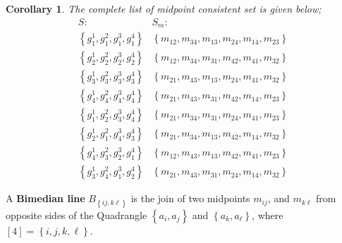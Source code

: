 \documentclass{unswthesis}
\newtheorem{corollary}[theorem]{Corollary}
\begin{document}
\begin{corollary}
The complete list of midpoint consistent set is given below;%
\begin{equation*}
\begin{array}{cc}
S: & S_{m}: \\ 
\left\{ g_{1}^{1},g_{1}^{2},g_{1}^{3},g_{1}^{4}\right\}  & \left\{
m_{12},m_{34},m_{13},m_{24},m_{14},m_{23}\right\}  \\ 
\left\{ g_{2}^{1},g_{2}^{2},g_{2}^{3},g_{2}^{4}\right\}  & \left\{
m_{12},m_{34},m_{31},m_{42},m_{41},m_{32}\right\}  \\ 
\left\{ g_{3}^{1},g_{3}^{2},g_{3}^{3},g_{3}^{4}\right\}  & \left\{
m_{21},m_{43},m_{13},m_{24},m_{41},m_{32}\right\}  \\ 
\left\{ g_{4}^{1},g_{4}^{2},g_{4}^{3},g_{4}^{4}\right\}  & \left\{
m_{21},m_{43},m_{31},m_{42},m_{14},m_{23}\right\}  \\ 
\left\{ g_{1}^{1},g_{2}^{2},g_{3}^{3},g_{4}^{4}\right\}  & \left\{
m_{21},m_{34},m_{31},m_{24},m_{41},m_{23}\right\}  \\ 
\left\{ g_{2}^{1},g_{1}^{2},g_{4}^{3},g_{3}^{4}\right\}  & \left\{
m_{21},m_{34},m_{13},m_{42},m_{14},m_{32}\right\}  \\ 
\left\{ g_{4}^{1},g_{3}^{2},g_{2}^{3},g_{1}^{4}\right\}  & \left\{
m_{12},m_{43},m_{13},m_{42},m_{41},m_{23}\right\}  \\ 
\left\{ g_{3}^{1},g_{4}^{2},g_{1}^{3},g_{2}^{4}\right\}  & \left\{
m_{21},m_{43},m_{31},m_{24},m_{14},m_{32}\right\} 
\end{array}%
\end{equation*}
\end{corollary}

\bigskip

A \textbf{Bimedian line} $B_{\left\{ ij,k\ell \right\} }$ is the join of two
midpoints $m_{ij}$, and $m_{k\ell }$ from opposite sides of the Quadrangle $%
\left\{ a_{i},a_{j}\right\} $ and $\left\{ a_{k},a_{\ell }\right\} $, where $%
\left[ 4\right] =\left\{ i,j,k,\ell \right\} $.
\end{document}
